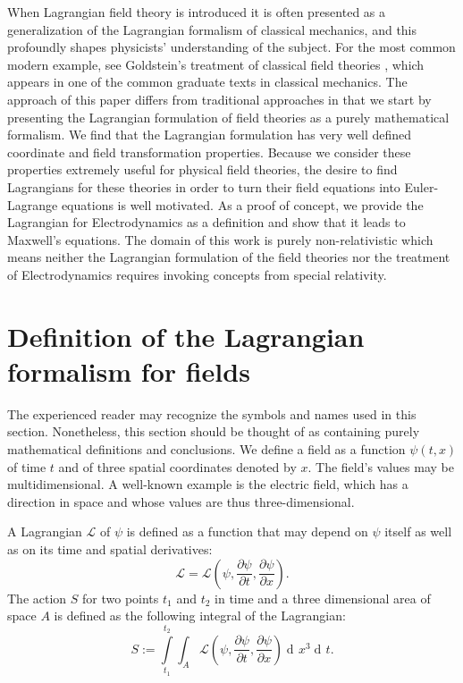 \documentclass[prb,preprint]{revtex4-1}
\DeclareMathOperator{\dd}{d\!}
\begin{document}
When Lagrangian field theory is introduced it is often presented as a generalization of the Lagrangian formalism of classical mechanics, and this profoundly shapes physicists' understanding of the subject.
For the most common modern example, see Goldstein's treatment of classical field theories \cite{goldstein2002classical}, which appears in one of the common graduate texts in classical mechanics.
The approach of this paper differs from traditional approaches in that we start by presenting the Lagrangian formulation of field theories as a purely mathematical formalism.
We find that the Lagrangian formulation has very well defined coordinate and field transformation properties.
Because we consider these properties extremely useful for physical field theories, the desire to find Lagrangians for these theories in order to turn their field equations into Euler-Lagrange equations is well motivated.
As a proof of concept, we provide the Lagrangian for Electrodynamics as a definition and show that it leads to Maxwell's equations.
The domain of this work is purely non-relativistic which means neither the Lagrangian formulation of the field theories nor the treatment of Electrodynamics requires invoking concepts from special relativity.

\section{Definition of the Lagrangian formalism for fields}\label{definition}

The experienced reader may recognize the symbols and names used in this section.
Nonetheless, this section should be thought of as containing purely mathematical definitions and conclusions.
We define a field as a function $\psi(t,x)$ of time $t$ and of three spatial coordinates denoted by $x$. 
The field's values may be multidimensional.
A well-known example is the electric field, which has a direction in space and whose values are thus three-dimensional.

A Lagrangian $\mathcal{L}$ of $\psi$ is defined as a function that may depend on $\psi$ itself as well as on its time and spatial derivatives: 
\begin{equation}
\mathcal{L} = \mathcal{L}\left(\psi, \frac{\partial \psi}{\partial t}, \frac{\partial \psi}{\partial x}\right).
\end{equation}
The action $S$ for two points $t_1$ and $t_2$ in time and a three dimensional area of space $A$ is defined as the following integral of the Lagrangian:
\begin{equation}
S := \int\limits_{t_1}^{t_2} \int_{A} \mathcal{L}\left(\psi, \frac{\partial \psi}{\partial t}, \frac{\partial \psi}{\partial x}\right) \dd x^3 \dd t.
\end{equation}
\end{document}
